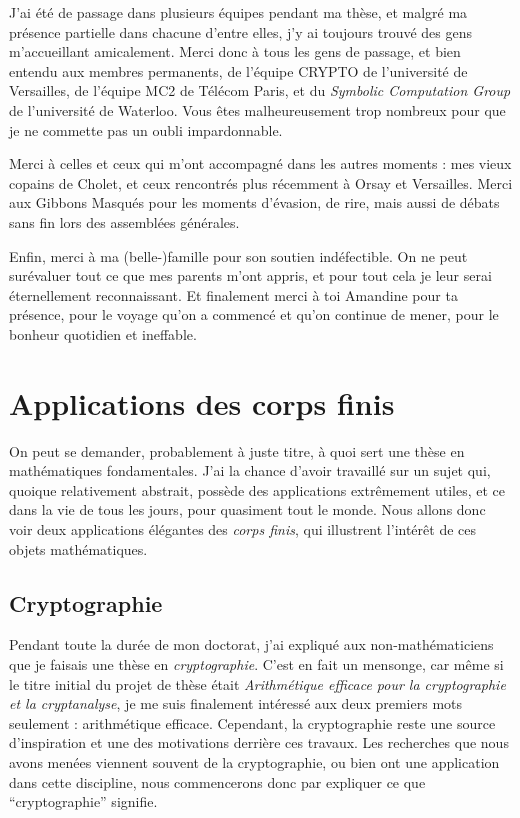 J'ai été de passage dans plusieurs équipes pendant ma thèse, et malgré ma
présence partielle dans chacune d'entre elles, j'y ai toujours trouvé des gens
m'accueillant amicalement. Merci donc à tous les gens de passage, et bien
entendu aux membres permanents,
de l'équipe CRYPTO de l'université de Versailles, de l'équipe MC2 de Télécom
Paris, et du \emph{Symbolic Computation Group} de l'université de Waterloo. Vous
êtes malheureusement trop nombreux pour que je ne commette pas un oubli
impardonnable.

Merci à celles et ceux qui m'ont accompagné dans les autres moments : mes vieux
copains de Cholet, et ceux rencontrés plus récemment à Orsay et Versailles.
Merci aux Gibbons Masqués pour les moments d'évasion, de rire, mais aussi de
débats sans fin lors des assemblées générales.

Enfin, merci à ma (belle-)famille pour son soutien indéfectible. On ne peut
surévaluer tout ce que mes parents m'ont appris, et pour tout cela je leur serai
éternellement reconnaissant. Et finalement merci à toi Amandine pour ta
présence, pour le voyage qu'on a commencé et qu'on continue de mener, pour le
bonheur quotidien et ineffable.

\clearpage
\section*{Applications des corps finis}

On peut se demander, probablement à juste titre, à quoi sert une thèse en
mathématiques fondamentales. J'ai la chance d'avoir travaillé sur un sujet qui,
quoique relativement abstrait, possède des applications extrêmement utiles, et
ce dans la vie de tous les jours, pour quasiment tout le monde. Nous allons donc
voir deux applications élégantes des \emph{corps finis}, qui illustrent
l'intérêt de ces objets mathématiques.

\subsection*{Cryptographie}
\label{sec:crypto}

Pendant toute la durée de mon doctorat, j'ai expliqué aux non-mathématiciens que
je faisais une thèse en \emph{cryptographie}. C'est en fait un mensonge, car
même si le titre initial du projet de thèse était \emph{Arithmétique efficace
pour la cryptographie et la cryptanalyse}, je me suis finalement intéressé
aux deux premiers mots seulement : arithmétique efficace. Cependant, la
cryptographie reste une source d'inspiration et une des motivations derrière ces
travaux. Les recherches que nous avons menées viennent souvent de la
cryptographie, ou bien ont une application dans cette discipline, nous
commencerons donc par expliquer ce que ``cryptographie'' signifie.


